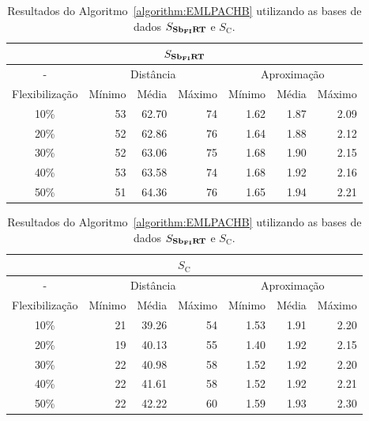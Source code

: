 \begin{table}[!htb]
  \caption{Resultados do Algoritmo~\ref{algorithm:EMLPACHB} utilizando as bases de dados $S_{\textbf{Sb\textsubscript{FI}RT}}{}$ e $S_{\text{C}}$.}
  \label{table:HQMTSFGN}
  \centering
  \begin{tabular}{|c|r|r|r|r|r|r|}
    \hline
    \multicolumn{7}{|c|}{$S_{\textbf{Sb\textsubscript{FI}RT}}{}$}                                                                      \\ \hline
      -            & \multicolumn{3}{c|}{Distância}             & \multicolumn{3}{c|}{Aproximação}           \\ \hline
    Flexibilização & Mínimo       & Média        & Máximo       & Mínimo       & Média        & Máximo       \\ \hline  
    10\%           & 53           & 62.70        & 74           & 1.62         & 1.87         & 2.09         \\ \hline
    20\%           & 52           & 62.86        & 76           & 1.64         & 1.88         & 2.12         \\ \hline
    30\%           & 52           & 63.06        & 75           & 1.68         & 1.90         & 2.15         \\ \hline
    40\%           & 53           & 63.58        & 74           & 1.68         & 1.92         & 2.16         \\ \hline
    50\%           & 51           & 64.36        & 76           & 1.65         & 1.94         & 2.21         \\ \hline    
  \end{tabular}

  \vspace{5mm}

  \begin{tabular}{|c|r|r|r|r|r|r|}
    \hline
    \multicolumn{7}{|c|}{$S_{\text{C}}$}                                                                     \\ \hline
      -            & \multicolumn{3}{c|}{Distância}             & \multicolumn{3}{c|}{Aproximação}           \\ \hline
    Flexibilização & Mínimo       & Média        & Máximo       & Mínimo       & Média        & Máximo       \\ \hline  
    10\%           & 21           & 39.26        & 54           & 1.53         & 1.91         & 2.20         \\ \hline
    20\%           & 19           & 40.13        & 55           & 1.40         & 1.92         & 2.15         \\ \hline
    30\%           & 22           & 40.98        & 58           & 1.52         & 1.92         & 2.20         \\ \hline
    40\%           & 22           & 41.61        & 58           & 1.52         & 1.92         & 2.21         \\ \hline
    50\%           & 22           & 42.22        & 60           & 1.59         & 1.93         & 2.30         \\ \hline    
  \end{tabular}
\end{table}

